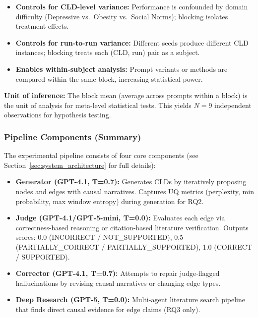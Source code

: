 \begin{itemize}[noitemsep]
    \item \textbf{Controls for CLD-level variance:} Performance is confounded by domain difficulty (Depressive vs.\ Obesity vs.\ Social Norms); blocking isolates treatment effects.
    \item \textbf{Controls for run-to-run variance:} Different seeds produce different CLD instances; blocking treats each (CLD, run) pair as a subject.
    \item \textbf{Enables within-subject analysis:} Prompt variants or methods are compared within the same block, increasing statistical power.
\end{itemize}

\textbf{Unit of inference:} The block mean (average across prompts within a block) is the unit of analysis for meta-level statistical tests. This yields $N=9$ independent observations for hypothesis testing.

\subsubsection{Pipeline Components (Summary)}

The experimental pipeline consists of four core components (see Section~\ref{sec:system_architecture} for full details):

\begin{itemize}[noitemsep]
    \item \textbf{Generator (GPT-4.1, T=0.7):} Generates CLDs by iteratively proposing nodes and edges with causal narratives. Captures UQ metrics (perplexity, min probability, max window entropy) during generation for RQ2.
    \item \textbf{Judge (GPT-4.1/GPT-5-mini, T=0.0):} Evaluates each edge via correctness-based reasoning or citation-based literature verification. Outputs scores: 0.0 (INCORRECT / NOT\_SUPPORTED), 0.5 (PARTIALLY\_CORRECT / PARTIALLY\_SUPPORTED), 1.0 (CORRECT / SUPPORTED).
    \item \textbf{Corrector (GPT-4.1, T=0.7):} Attempts to repair judge-flagged hallucinations by revising causal narratives or changing edge types.
    \item \textbf{Deep Research (GPT-5, T=0.0):} Multi-agent literature search pipeline that finds direct causal evidence for edge claims (RQ3 only).
\end{itemize}

